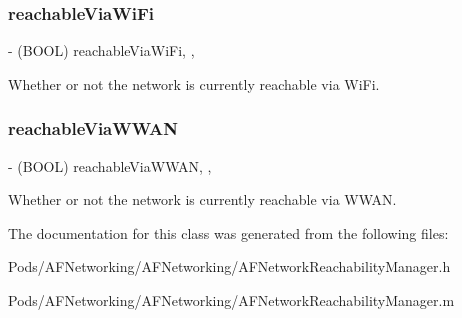 \subsubsection{\texorpdfstring{reachable\+Via\+Wi\+Fi}{reachableViaWiFi}}
{\footnotesize\ttfamily -\/ (B\+O\+OL) reachable\+Via\+Wi\+Fi\hspace{0.3cm}{\ttfamily [read]}, {\ttfamily [nonatomic]}, {\ttfamily [assign]}}

Whether or not the network is currently reachable via Wi\+Fi. \mbox{\label{interface_a_f_network_reachability_manager_a3bf818f1daba31c4b15949679d348025}} 
\subsubsection{\texorpdfstring{reachable\+Via\+W\+W\+AN}{reachableViaWWAN}}
{\footnotesize\ttfamily -\/ (B\+O\+OL) reachable\+Via\+W\+W\+AN\hspace{0.3cm}{\ttfamily [read]}, {\ttfamily [nonatomic]}, {\ttfamily [assign]}}

Whether or not the network is currently reachable via W\+W\+AN. 

The documentation for this class was generated from the following files\+:\begin{DoxyCompactItemize}
\item 
Pods/\+A\+F\+Networking/\+A\+F\+Networking/A\+F\+Network\+Reachability\+Manager.\+h\item 
Pods/\+A\+F\+Networking/\+A\+F\+Networking/A\+F\+Network\+Reachability\+Manager.\+m\end{DoxyCompactItemize}
